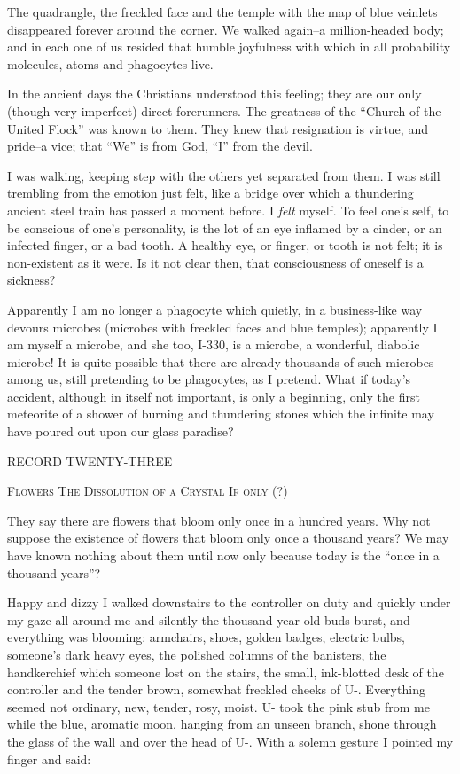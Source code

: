 \documentclass[11pt,openany]{book}
\begin{document}
The quadrangle, the freckled face and the temple with the map of blue veinlets disappeared forever around the corner. We walked again--a million-headed body; and in each one of us resided that humble joyfulness with which in all probability molecules, atoms and phagocytes live.

In the ancient days the Christians understood this feeling; they are our only (though very imperfect) direct forerunners. The greatness of the ``Church of the United Flock'' was known to them. They knew that resignation is virtue, and pride--a vice; that ``We'' is from God, ``I'' from the devil.

I was walking, keeping step with the others yet separated from them. I was still trembling from the emotion just felt, like a bridge over which a thundering ancient steel train has passed a moment before. I \emph{felt} myself. To feel one's self, to be conscious of one's personality, is the lot of an eye inflamed by a cinder, or an infected finger, or a bad tooth. A healthy eye, or finger, or tooth is not felt; it is non-existent as it were. Is it not clear then, that consciousness of oneself is a sickness?

Apparently I am no longer a phagocyte which quietly, in a business-like way devours microbes (microbes with freckled faces and blue temples); apparently I am myself a microbe, and she too, I-330, is a microbe, a wonderful, diabolic microbe! It is quite possible that there are already thousands of such microbes among us, still pretending to be phagocytes, as I pretend. What if today's accident, although in itself not important, is only a beginning, only the first meteorite of a shower of burning and thundering stones which the infinite may have poured out upon our glass paradise?

\begin{center}\textsc{RECORD TWENTY-THREE}\end{center}

\begin{center}\textsc{Flowers The Dissolution of a Crystal If only (?)}\end{center}

They say there are flowers that bloom only once in a hundred years. Why not suppose the existence of flowers that bloom only once a thousand years? We may have known nothing about them until now only because today is the ``once in a thousand years''?

Happy and dizzy I walked downstairs to the controller on duty and quickly under my gaze all around me and silently the thousand-year-old buds burst, and everything was blooming: armchairs, shoes, golden badges, electric bulbs, someone's dark heavy eyes, the polished columns of the banisters, the handkerchief which someone lost on the stairs, the small, ink-blotted desk of the controller and the tender brown, somewhat freckled cheeks of U-. Everything seemed not ordinary, new, tender, rosy, moist. U- took the pink stub from me while the blue, aromatic moon, hanging from an unseen branch, shone through the glass of the wall and over the head of U-. With a solemn gesture I pointed my finger and said:
\end{document}
